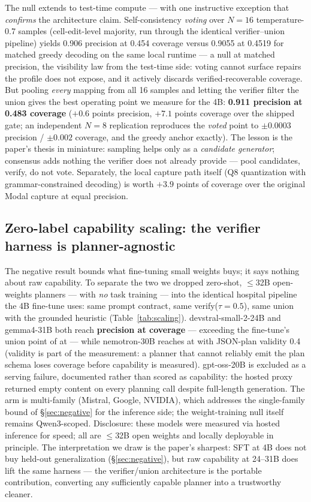 \documentclass[11pt]{article}
\begin{document}
The null extends to test-time compute --- with one instructive exception that
\emph{confirms} the architecture claim. Self-consistency \emph{voting} over
$N{=}16$ temperature-0.7 samples (cell-edit-level majority, run through the
identical verifier--union pipeline) yields 0.906 precision at 0.454 coverage
versus 0.9055 at 0.4519 for matched greedy decoding on the same local runtime ---
a null at matched precision, the visibility law from the test-time side: voting
cannot surface repairs the profile does not expose, and it actively discards
verified-recoverable coverage. But pooling \emph{every} mapping from all 16
samples and letting the verifier filter the union gives the best operating point
we measure for the 4B: \textbf{0.911 precision at 0.483 coverage} ($+0.6$ points
precision, $+7.1$ points coverage over the shipped gate; an independent $N{=}8$
replication reproduces the \emph{voted} point to $\pm 0.0003$ precision /
$\pm 0.002$ coverage, and the greedy anchor exactly). The lesson is the paper's thesis in miniature: sampling
helps only as a \emph{candidate generator}; consensus adds nothing the verifier
does not already provide --- pool candidates, verify, do not vote. Separately,
the local capture path itself (Q8 quantization with grammar-constrained decoding)
is worth $+3.9$ points of coverage over the original Modal capture at equal
precision.

\subsection{Zero-label capability scaling: the verifier harness is planner-agnostic}
\label{sec:scaling}
The negative result bounds what fine-tuning small weights buys; it says nothing
about raw capability. To separate the two we dropped zero-shot, $\leq$32B
open-weights planners --- with \emph{no} task training --- into the identical
hospital pipeline the 4B fine-tune uses: same prompt contract, same
verify($\tau{=}0.5$), same union with the grounded heuristic
(Table~\ref{tab:scaling}). devstral-small-2-24B and gemma4-31B both reach
\textbf{\scalePrecBig{} precision at \scaleCovBig{} coverage} --- exceeding the
fine-tune's union point of \unionGatePrec{} at \unionGateCov{} --- while
nemotron-30B reaches \scalePrecNemo{} at \scaleCovNemo{} with JSON-plan validity
0.4 (validity is part of the measurement: a planner that cannot reliably emit the
plan schema loses coverage before capability is measured). gpt-oss-20B is
excluded as a serving failure, documented rather than scored as capability: the
hosted proxy returned empty content on every planning call despite full-length
generation. The arm is multi-family (Mistral, Google, NVIDIA), which addresses
the single-family bound of \S\ref{sec:negative} for the inference side; the
weight-training null itself remains Qwen3-scoped. Disclosure: these models were
measured via hosted inference for speed; all are $\leq$32B open weights and
locally deployable in principle. The interpretation we draw is the paper's
sharpest: SFT at 4B does not buy held-out generalization (\S\ref{sec:negative}),
but raw capability at 24--31B does lift the same harness --- the verifier/union
architecture is the portable contribution, converting any sufficiently capable
planner into a trustworthy cleaner.
\end{document}
